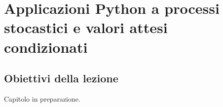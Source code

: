
\chapter{Applicazioni Python a processi stocastici e valori attesi condizionati}

\section{Obiettivi della lezione}

Capitolo in preparazione.

